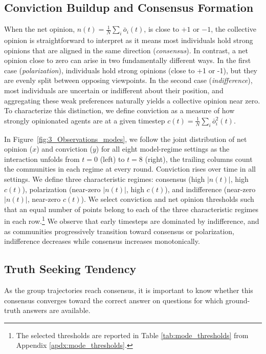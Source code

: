 \subsection{Conviction Buildup and Consensus Formation}
\label{sec:obs_phase_char}

When the net opinion, \(
n(t) = \frac{1}{N}\sum_i \bar{o}_i(t)
\), is close to $+1$ or $-1$, the collective opinion is straightforward to interpret as it means most individuals hold strong opinions that are aligned in the same direction (\textit{consensus}). In contrast, a net opinion close to zero can arise in two fundamentally different ways. In the first case (\textit{polarization}), individuals hold strong opinions (close to +1 or -1), but they are evenly split between opposing viewpoints.  In the second case (\textit{indifference}), most individuals are uncertain or indifferent about their position, and aggregating these weak preferences naturally yields a collective opinion near zero. To characterize this distinction, we define conviction as a measure of how strongly opinionated agents are at a given timestep \(
c(t) = \frac{1}{N}\sum_i \bar{o}_i^2(t)
\). 

In Figure~\ref{fig:3_Observations_modes}, we follow the joint distribution of net opinion ($x$) and conviction ($y$) for all eight model-regime settings as the interaction unfolds from $t=0$ (left) to $t=8$ (right), the trailing columns count the communities in each regime at every round. Conviction rises over time in all settings. We define three characteristic regimes: consensus (high $|n(t)|$, high $c(t)$), polarization (near-zero $|n(t)|$, high $c(t)$), and indifference (near-zero $|n(t)|$, near-zero $c(t)$). We select conviction and net opinion  thresholds such that an equal number of points belong to each of the three characteristic regimes in each row.\footnote{The selected thresholds are reported in Table \ref{tab:mode_thresholds} from Appendix \ref{apdx:mode_thresholds}.} We observe that early timesteps are dominated by indifference, and as communities progressively transition toward consensus or polarization, indifference decreases while consensus increases monotonically.


\subsection{Truth Seeking Tendency}\label{sec:truth_seeking}

As the group trajectories reach consensus, it is important to know whether this consensus converges toward the correct answer on questions for which ground-truth answers  are available.


